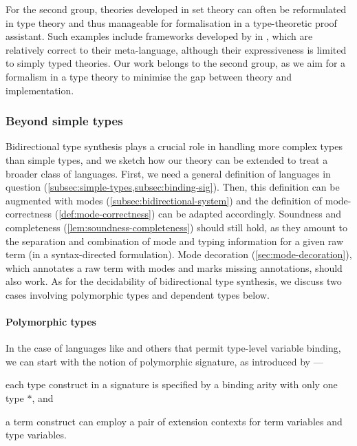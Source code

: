 For the second group, theories developed in set theory can often be reformulated in type theory and thus manageable for formalisation in a type-theoretic proof assistant. 
Such examples include frameworks developed by \citet{Allais2021,Ahrens2022,Fiore2022} in \Agda, which are relatively correct to their meta-language, although their expressiveness is limited to simply typed theories.
Our work belongs to the second group, as we aim for a formalism in a type theory to minimise the gap between theory and implementation.

\subsubsection{Beyond simple types}

Bidirectional type synthesis plays a crucial role in handling more complex types than simple types, and we sketch how our theory can be extended to treat a broader class of languages.
First, we need a general definition of languages in question (\cref{subsec:simple-types,subsec:binding-sig}).
Then, this definition can be augmented with modes (\cref{subsec:bidirectional-system}) and the definition of mode-correctness (\cref{def:mode-correctness}) can be adapted accordingly.
Soundness and completeness (\cref{lem:soundness-completeness}) should still hold, as they amount to the separation and combination of mode and typing information for a given raw term (in a syntax-directed formulation).
Mode decoration (\cref{sec:mode-decoration}), which annotates a raw term with modes and marks missing annotations, should also work.
As for the decidability of bidirectional type synthesis, we discuss two cases involving polymorphic types and dependent types below.

\paragraph{Polymorphic types}
In the case of languages like \SystemF and others that permit type-level variable binding, we can start with the notion of polymorphic signature, as introduced by \citet{Hamana2011}---\begin{inlineenum}
  \item each type construct in a signature is specified by a binding arity with only one type $*$, and
  \item a term construct can employ a pair of extension contexts for term variables and type variables.
\end{inlineenum}


